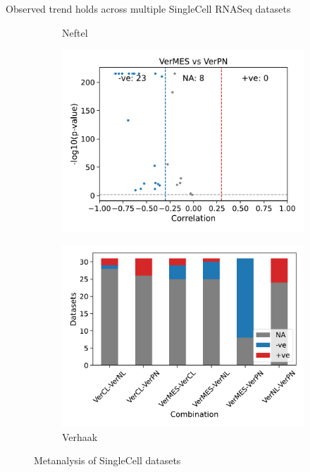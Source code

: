 \documentclass[aspectratio=169,9pt]{beamer}
\begin{document}
\begin{frame}{Observed trend holds across multiple SingleCell RNASeq datasets}
\begin{adjustwidth}{-5cm}{-5cm}
\begin{figure}
\begin{subfigure}[c]{0.33\textwidth}
                    \caption{Neftel}
                \end{subfigure}
                \pause
                \begin{subfigure}[c]{0.22\textwidth}
                    \centering
                    \includegraphics[width=\textwidth]{Volcano_SC_VerMES-VerPN}
                \end{subfigure}
                \begin{subfigure}[c]{0.33\textwidth}
                    \centering
                    \includegraphics[width=\textwidth]{Bar_SC_Ver}
                    \caption{Verhaak}
                \end{subfigure}
                \pause[1]\caption{Metanalysis of SingleCell datasets}
            \end{figure}
        \end{adjustwidth}
    \end{frame}
\end{document}
